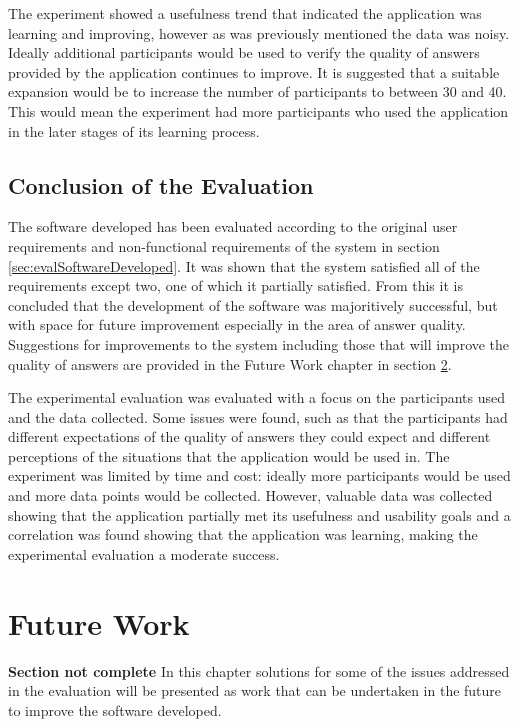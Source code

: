 \documentclass[authoryearcitations]{UoYCSproject}
\begin{document}
The experiment showed a usefulness trend that indicated the application was learning and improving, however as was previously mentioned the data was noisy. Ideally additional participants would be used to verify the quality of answers provided by the application continues to improve. It is suggested that a suitable expansion would be to increase the number of participants to between 30 and 40. This would mean the experiment had more participants who used the application in the later stages of its learning process.

\section{Conclusion of the Evaluation}
\label{sec:conclusionOfEval}
The software developed has been evaluated according to the original user requirements and non-functional requirements of the system in section \ref{sec:evalSoftwareDeveloped}. It was shown that the system satisfied all of the requirements except two, one of which it partially satisfied. From this it is concluded that the development of the software was majoritively successful, but with space for future improvement especially in the area of answer quality. Suggestions for improvements to the system including those that will improve the quality of answers are provided in the Future Work chapter in section \ref{sec:extending}.

The experimental evaluation was evaluated with a focus on the participants used and the data collected. Some issues were found, such as that the participants had different expectations of the quality of answers they could expect and different perceptions of the situations that the application would be used in. The experiment was limited by time and cost: ideally more participants would be used and more data points would be collected. However, valuable data was collected showing that the application partially met its usefulness and usability  goals and a correlation was found showing that the application was learning, making the experimental evaluation a moderate success.

\newpage

\chapter{Future Work}
\label{sec:extending}
{\bf Section not complete}
In this chapter solutions for some of the issues addressed in the evaluation will be presented as work that can be undertaken in the future to improve the software developed.
\end{document}
